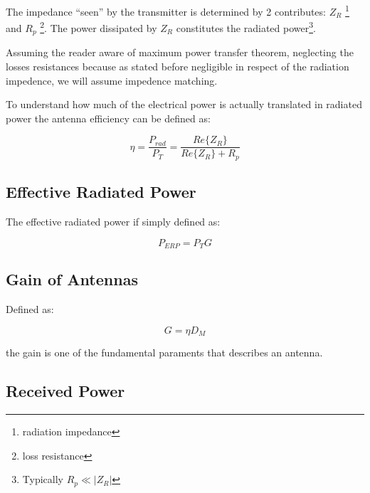 The impedance “seen” by the transmitter is determined by 2 contributes: $Z_R$ \footnote{radiation impedance} and $R_p$ \footnote{loss resistance}. The power dissipated by $Z_R$ constitutes the radiated power\footnote{Typically $R_p \ll |Z_R|$}.

Assuming the reader aware of maximum power transfer theorem, neglecting the losses resistances because as stated before negligible in respect of the radiation impedence, we will assume impedence matching.

To understand how much of the electrical power is actually translated in radiated power the antenna efficiency can be defined as:

\begin{equation}
  	\eta = \frac{P_{rad}}{P_T}= \frac{Re\{ Z_R \}}{Re\{ Z_R \}+R_p}
  \end{equation}  


\subsection{Effective Radiated Power} %
\label{sub:effective_radiated_power}

The effective radiated power if simply defined as:

\begin{equation}
	P_{ERP} = P_TG 
\end{equation}


\subsection{Gain of Antennas} %
\label{sub:gain_of_antenna}

Defined as:

\begin{equation}
	G = \eta D_M
\end{equation}

the gain is one of the fundamental paraments that describes an antenna.


\subsection{Received Power} %
\label{sub:received_power}


